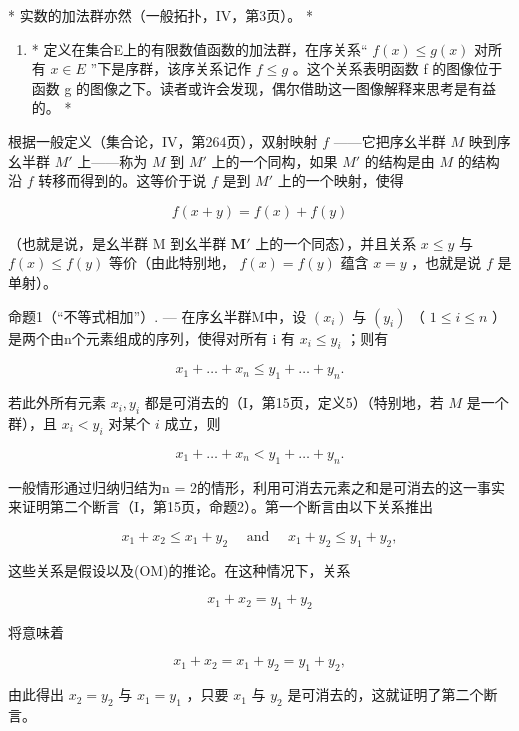 * 实数的加法群亦然（一般拓扑，IV，第3页）。 *

\begin{enumerate}
\def\labelenumi{\arabic{enumi})}
\setcounter{enumi}{1}
\tightlist
\item
  * 定义在集合E上的有限数值函数的加法群，在序关系“ \(f(x) \leq g(x)\) 对所有 \(x \in E\) ”下是序群，该序关系记作 \(f \leq g\) 。这个关系表明函数 f 的图像位于函数 g 的图像之下。读者或许会发现，偶尔借助这一图像解释来思考是有益的。 *
\end{enumerate}

根据一般定义（集合论，IV，第264页），双射映射 \(f\) ——它把序幺半群 \(M\) 映到序幺半群 \(M'\) 上——称为 \(M\) 到 \(M'\) 上的一个同构，如果 \(M'\) 的结构是由 \(M\) 的结构沿 \(f\) 转移而得到的。这等价于说 \(f\) 是到 \(M'\) 上的一个映射，使得

\[
f (x + y) = f (x) + f (y)
\]

（也就是说，是幺半群 M 到幺半群 \(\mathbf{M}'\) 上的一个同态），并且关系 \(x \leqslant y\) 与 \(f(x) \leqslant f(y)\) 等价（由此特别地， \(f(x) = f(y)\) 蕴含 \(x = y\) ，也就是说 \(f\) 是单射）。

命题1（“不等式相加”）. --- 在序幺半群M中，设 \((x_{i})\) 与 \((y_{i})\) （ \(1 \leqslant i \leqslant n\) ）是两个由n个元素组成的序列，使得对所有 i 有 \(x_{i} \leqslant y_{i}\) ；则有

\[
x _ {1} + \dots + x _ {n} \leqslant y _ {1} + \dots + y _ {n}.
\]

若此外所有元素 \(x_{i}, y_{i}\) 都是可消去的（I，第15页，定义5）（特别地，若 \(M\) 是一个群），且 \(x_{i} < y_{i}\) 对某个 \(i\) 成立，则

\[
x _ {1} + \dots + x _ {n} <   y _ {1} + \dots + y _ {n}.
\]

一般情形通过归纳归结为n = 2的情形，利用可消去元素之和是可消去的这一事实来证明第二个断言（I，第15页，命题2）。第一个断言由以下关系推出

\[
x _ {1} + x _ {2} \leqslant x _ {1} + y _ {2} \quad \text { and } \quad x _ {1} + y _ {2} \leqslant y _ {1} + y _ {2},
\]

这些关系是假设以及(OM)的推论。在这种情况下，关系

\[
x _ {1} + x _ {2} = y _ {1} + y _ {2}
\]

将意味着

\[
x _ {1} + x _ {2} = x _ {1} + y _ {2} = y _ {1} + y _ {2},
\]

由此得出 \(x_{2} = y_{2}\) 与 \(x_{1} = y_{1}\) ，只要 \(x_{1}\) 与 \(y_{2}\) 是可消去的，这就证明了第二个断言。

